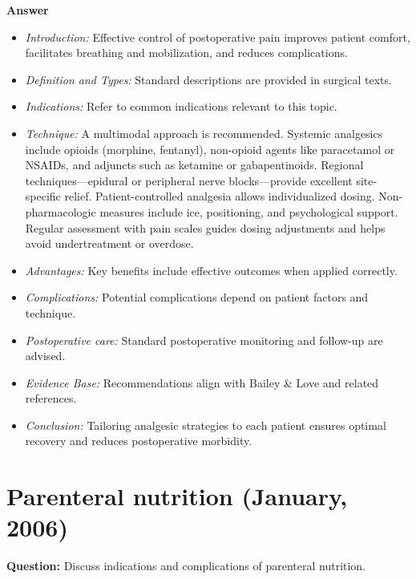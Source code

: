 \documentclass{article}
\begin{document}
\textbf{Answer}
\begin{itemize}

\item \emph{Introduction:} Effective control of postoperative pain improves patient comfort, facilitates breathing and mobilization, and reduces complications.
\item \emph{Definition and Types:} Standard descriptions are provided in surgical texts.
\item \emph{Indications:} Refer to common indications relevant to this topic.

\item \emph{Technique:} A multimodal approach is recommended. Systemic analgesics include opioids (morphine, fentanyl), non-opioid agents like paracetamol or NSAIDs, and adjuncts such as ketamine or gabapentinoids. Regional techniques—epidural or peripheral nerve blocks—provide excellent site-specific relief. Patient-controlled analgesia allows individualized dosing. Non-pharmacologic measures include ice, positioning, and psychological support. Regular assessment with pain scales guides dosing adjustments and helps avoid undertreatment or overdose.
\item \emph{Advantages:} Key benefits include effective outcomes when applied correctly.
\item \emph{Complications:} Potential complications depend on patient factors and technique.
\item \emph{Postoperative care:} Standard postoperative monitoring and follow-up are advised.
\item \emph{Evidence Base:} Recommendations align with Bailey \& Love and related references.

\item \emph{Conclusion:} Tailoring analgesic strategies to each patient ensures optimal recovery and reduces postoperative morbidity.


\end{itemize}

\section{Parenteral nutrition (January, 2006)}

\textbf{Question:} Discuss indications and complications of parenteral nutrition.
\end{document}
